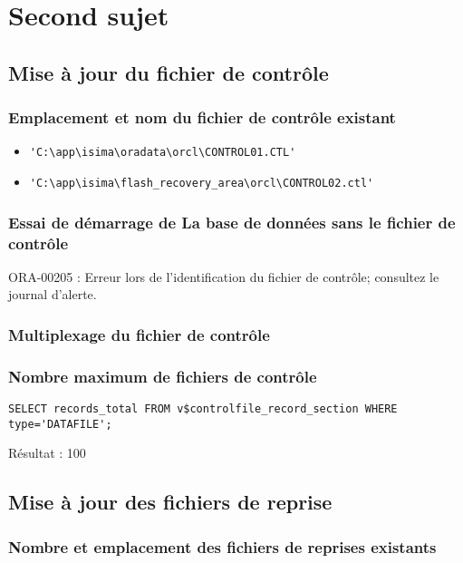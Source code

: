 \section{Second sujet}
\subsection{Mise à jour du fichier de contrôle}

\subsubsection{Emplacement et nom du fichier de contrôle existant}

\begin{itemize}
	\item \verb|'C:\app\isima\oradata\orcl\CONTROL01.CTL'|
	\item \verb|'C:\app\isima\flash_recovery_area\orcl\CONTROL02.ctl'|
\end{itemize}

\subsubsection{Essai de démarrage de La base de données sans le fichier de contrôle}

ORA-00205 : Erreur lors de l'identification du fichier de contrôle; consultez le journal d'alerte.

\subsubsection{Multiplexage du fichier de contrôle}


\subsubsection{Nombre maximum de fichiers de contrôle}

\begin{verbatim}
SELECT records_total FROM v$controlfile_record_section WHERE type='DATAFILE';
\end{verbatim}

Résultat : 100

\subsection{Mise à jour des fichiers de reprise}
\subsubsection{Nombre et emplacement des fichiers de reprises existants}

